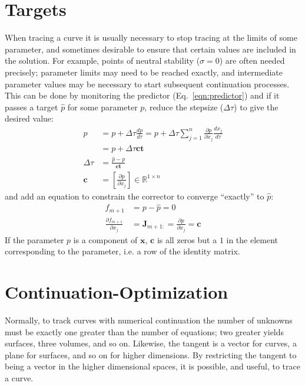 \documentclass[10pt,openany,twoside]{book}
\numberwithin{equation}{section}   %
\newcommand{\Matrix}[1]{\boldsymbol{#1}}
\newcommand{\Vector}[1]{\boldsymbol{#1}}
\newcommand{\Eqn}[1]{Eq.\ \ref{#1}}
\newcommand{\Step}{\Delta\tau} %
\begin{document}
\section{Targets}\label{sect:targets}
When tracing a curve it is usually necessary to stop tracing at the limits
of some parameter, and sometimes desirable to ensure that
certain values are included in the solution.
For example,
points of neutral stability ($\sigma = 0$) are often needed precisely;
parameter limits may need to be reached exactly, and intermediate
parameter values may be necessary to start subsequent continuation processes.
This can be done by monitoring the predictor (\Eqn{eqn:predictor}) and
if it passes a target $\hat{p}$ for some parameter $p$, reduce the stepsize
($\Step$) to give the desired value:
\begin{align}
\hat{p} & = p + \Step \frac{dp}{d\tau}
	= p + \Step\sum_{j=1}^n \frac{\partial p}{\partial x_j}\frac{dx_j}{d\tau} \nonumber \\
	& = p + \Step \Vector{c} \Vector{t}  \nonumber \\
\Step & = \frac{\hat{p} - p}{\Vector{c}\Vector{t}} \nonumber \\
\Vector{c} & = \left[ \frac{\partial p}{\partial x_j} \right] 
\in \mathbb{R}^{1 \times n}
\end{align}
and add an equation to constrain the corrector to converge ``exactly''
to $\hat{p}$:
\begin{align}
f_{m+1} & = p - \hat{p} = 0  \nonumber \\
\frac{\partial f_{m+1}}{\partial x_j} & = \Matrix{J}_{m+1:} = \frac{\partial p}{\partial x_j}
	= \Vector{c}
\end{align}
If the parameter $p$ is a component of $\Vector{x}$, $\Vector{c}$ is all zeros
but a $1$ in the element corresponding to the parameter, i.e. a row of the identity matrix.


\section{Continuation-Optimization}\label{sect:optim}
Normally, to track curves with numerical continuation the number of unknowns
must be exactly one greater than the number of equations; two greater
yields surfaces, three volumes, and so on. Likewise, the tangent is a
vector for curves, a plane for surfaces, and so on for higher dimensions.
By restricting the tangent to being a vector in the higher dimensional
spaces, it is possible, and useful, to trace a curve.
\end{document}
